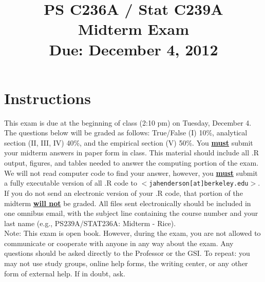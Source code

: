 \documentclass{article}
\title{PS C236A / Stat C239A \\  Midterm Exam \\ Due: December 4, 2012}
\date{}
\begin{document}


\maketitle
\vspace{-4em}
\section*{Instructions}





\noindent This exam is due at the beginning of class (2:10 pm) on
Tuesday, December 4. The questions below will be graded as follows:
True/False (I) 10\%, analytical section (II, III, IV) 40\%, and the
empirical section (V) 50\%.  You \underline{\bf must} submit your
midterm answers in paper form in class.  This material should include
all .R output, figures, and tables needed to answer the computing
portion of the exam.  We will not read computer code to find your
answer, however, you \underline{\bf must} submit a fully executable
version of all .R code to
$<$\texttt{jahenderson[at]berkeley.edu}$>$. If you do not send an
electronic version of your .R code, that portion of the midterm 
\underline{\bf will not} be graded.  All files sent electronically
should be included
in one omnibus email, with the subject line containing the course number and your last name (e.g., PS239A/STAT236A: Midterm - Rice).\\


\noindent Note: This exam is open book.  However, during the exam,
you are not allowed to communicate or cooperate with anyone in
any way about the exam. Any questions should be asked directly to the
Professor or the GSI. To repeat: you may not use study groups, online
help forms, the writing center, or any other form of external help.
If in doubt, ask.
\end{document}
